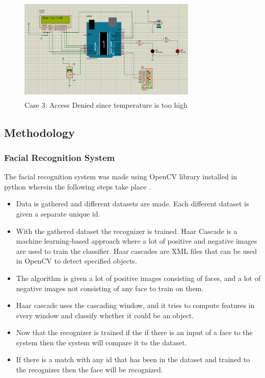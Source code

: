 \documentclass[conference]{IEEEtran}
\begin{document}
	\begin{figure}
		\centering
		\includegraphics[width=8.5cm, height=5cm]{ProtC3.png}
		\caption{\label{fig:The-caption}Case 3: Access Denied since temperature is too high}
	\end{figure}
	\subsection{Methodology}
	\subsubsection{Facial Recognition System}
	The facial recognition system was made using OpenCV library installed in python wherein the following steps take place \cite{g}.
	\begin{itemize}
		\item Data is gathered and different datasets are made. Each different dataset is given a separate unique id.
		\item With the gathered dataset the recognizer is trained. Haar Cascade is a machine learning-based approach where a lot of positive and negative images are used to train the classifier. Haar cascades are XML files that can be used in OpenCV to detect specified objects.
		\item The algorithm is given a lot of positive images consisting of faces, and a lot of negative images not consisting of any face to train on them. 
		\item Haar cascade uses the cascading window, and it tries to compute features in every window and classify whether it could be an object. 
		\item Now that the recognizer is trained if the if there is
		an input of a face to the system then the system
		will compare it to the dataset.
		\item If there is a match with any id that has been in the dataset and trained to the recognizer then the face
		will be recognized.\\
	\end{itemize}
\end{document}
